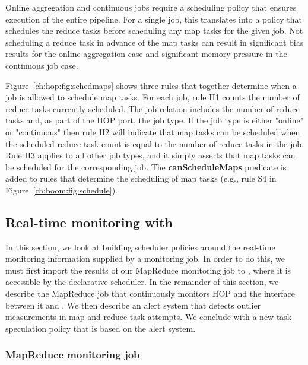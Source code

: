 Online aggregation and continuous jobs require a scheduling policy that
ensures execution of the entire pipeline. For a single job, this translates into a policy that
schedules the reduce tasks before scheduling any map tasks for the given job. Not scheduling
a reduce task in advance of the map tasks can result in significant bias results for the online 
aggregation case and significant memory pressure in the continuous job case. 

Figure~\ref{ch:hop:fig:schedmaps} shows three rules that together determine when a job is allowed
to schedule map tasks. For each job, rule H1 counts the number of reduce tasks currently scheduled.
The job relation includes the number of reduce tasks and, as part of the HOP port, the job type. If
the job type is either "online" or "continuous" then rule H2 will indicate that map tasks can be scheduled
when the scheduled reduce task count is equal to the number of reduce tasks in the job. Rule H3 applies
to all other job types, and it simply asserts that map tasks can be scheduled for the corresponding job. 
The {\bf canScheduleMaps} predicate is added to rules that determine the scheduling of map tasks 
(e.g., rule S4 in Figure~\ref{ch:boom:fig:schedule}).

\subsection{Real-time monitoring with \JOL}
\label{ch:hop:sec:jolmonitor}

In this section, we look at building scheduler policies around the real-time monitoring information supplied by a
monitoring job. In order to do this, we must first import the results of our MapReduce monitoring job to \JOL, where
it is accessible by the declarative scheduler. In the remainder of this section, we describe the MapReduce job that
continuously monitors HOP and the interface between it and \JOL. We then describe an alert system that detects outlier measurements in map and 
reduce task attempts. We conclude with a new task speculation policy that is based on the alert system.

\subsubsection{MapReduce monitoring job}


